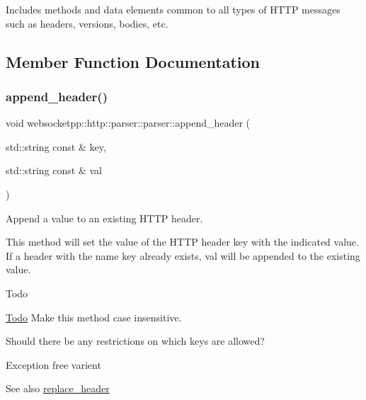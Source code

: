 Includes methods and data elements common to all types of H\+T\+TP messages such as headers, versions, bodies, etc. 

\subsection{Member Function Documentation}
\mbox{\label{classwebsocketpp_1_1http_1_1parser_1_1parser_abd39762de5ec467a29a537d79602b603}} 
\subsubsection{\texorpdfstring{append\+\_\+header()}{append\_header()}}
{\footnotesize\ttfamily void websocketpp\+::http\+::parser\+::parser\+::append\+\_\+header (\begin{DoxyParamCaption}\item[{std\+::string const \&}]{key,  }\item[{std\+::string const \&}]{val }\end{DoxyParamCaption})\hspace{0.3cm}{\ttfamily [inline]}}



Append a value to an existing H\+T\+TP header. 

This method will set the value of the H\+T\+TP header {\ttfamily key} with the indicated value. If a header with the name {\ttfamily key} already exists, {\ttfamily val} will be appended to the existing value.

\begin{DoxyRefDesc}{Todo}
\item[\mbox{\hyperlink{todo__todo000017}{Todo}}]Make this method case insensitive. 

Should there be any restrictions on which keys are allowed? 

Exception free varient\end{DoxyRefDesc}


\begin{DoxySeeAlso}{See also}
\mbox{\hyperlink{classwebsocketpp_1_1http_1_1parser_1_1parser_aba2991b2aa41ca60d9427950502b0b93}{replace\+\_\+header}}
\end{DoxySeeAlso}

